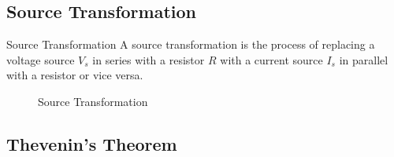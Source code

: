 \documentclass[12pt]{article}
\begin{document}
\subsection{Source Transformation}
\label{ssec:sourceTransformation}

\begin{definition}{Source Transformation}
  A source transformation is the process of replacing a voltage source $V_s$ in series with a resistor $R$ with a current source $I_s$ in parallel with a resistor or vice versa.
\end{definition}

\begin{figure}[H]
  \centering
  
  \caption{Source Transformation}
  \label{fig:014}
\end{figure}

\subsection{Thevenin's Theorem}
\label{ssec:theveninsTheorem}
\end{document}
